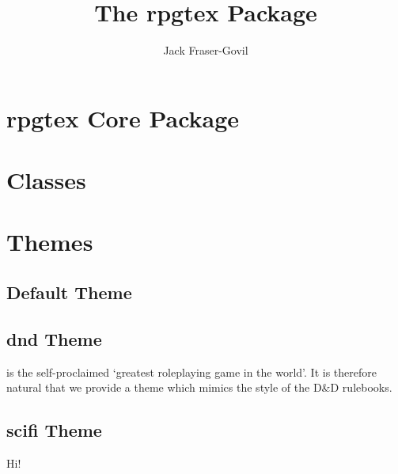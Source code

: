 \documentclass[11pt,theme=default]{rpgbook}
\title{The rpgtex Package}
\author{Jack Fraser-Govil}
\begin{document}
	\frontmatter
	\maketitle{}

	\tableofcontents
	\mainmatter{}


	\part{rpgtex Core Package}

	\part{Classes}
		\chapter{}
	\part{Themes}
	\chapter{Default Theme}

		\chapter{dnd Theme}

			 is the self-proclaimed `greatest roleplaying game in the world'. It is therefore natural that we provide a theme which mimics the style of the D\&D rulebooks. \blindtext{}

	\chapter{scifi Theme}
		Hi!
\end{document}
